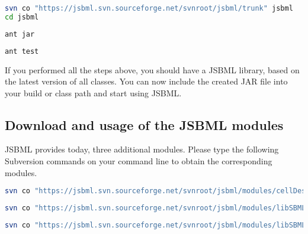 \begin{lstlisting}[language=bash,numbers=none,float=h,captionpos=t,
title={Use the following command to download the latest JSBML classes (requires
Subversion\footref{fn:svn}):}]
svn co "https://jsbml.svn.sourceforge.net/svnroot/jsbml/trunk" jsbml
cd jsbml
\end{lstlisting}

\begin{lstlisting}[language=bash,numbers=none,float=h,captionpos=t,
title={To compile the JSBML library to a single JAR file, type the following
command (requires Apache Ant\footref{fn:ant}):}]
ant jar
\end{lstlisting}

\begin{lstlisting}[language=bash,numbers=none,float=h,captionpos=t,
title={If you want to run the JUnit tests on your compiled JAR file, please use
the following command:}]
ant test
\end{lstlisting}

If you performed all the steps above, you should have a JSBML library, based on
the latest version of all classes. You can now include the created JAR file into
your build or class path and start using JSBML.

\subsection{Download and usage of the JSBML modules}

JSBML provides today, three additional modules. Please type the following
Subversion commands on your command line to obtain the
corresponding modules.

\begin{lstlisting}[language=bash,numbers=none,float=h,captionpos=t,
title={The CellDesigner bridge-module should help CellDesigner plugin developers
to use JSBML as internal datastructure.}]
svn co "https://jsbml.svn.sourceforge.net/svnroot/jsbml/modules/cellDesigner" cellDesigner
\end{lstlisting}

\begin{lstlisting}[language=bash,numbers=none,float=h,captionpos=t,
title={Developers, who still want to make use of libSBML (e.g., to use the
SBML-validator), might want to have a look at the libSBML communication layer.}]
svn co "https://jsbml.svn.sourceforge.net/svnroot/jsbml/modules/libSBMLio/" libSBMLio
\end{lstlisting}

\begin{lstlisting}[language=bash,numbers=none,float=h,captionpos=t,
title={The third module is a compatibility module to ease switching from libSBML
to JSBML.}]
svn co "https://jsbml.svn.sourceforge.net/svnroot/jsbml/modules/libSBMLcompat" libSBMLcompat
\end{lstlisting}

